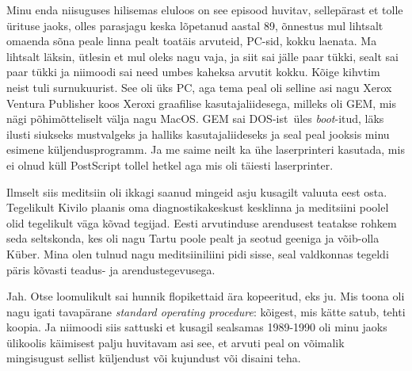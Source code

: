 Minu enda niisuguses hilisemas eluloos on see episood huvitav, sellepärast et tolle ürituse jaoks, olles parasjagu keska lõpetanud aastal 89,  õnnestus mul lihtsalt omaenda sõna peale linna pealt toatäis arvuteid, PC-sid, kokku laenata. Ma lihtsalt läksin, ütlesin et mul oleks nagu vaja, ja siit sai jälle paar tükki, sealt sai paar tükki ja niimoodi sai need umbes kaheksa arvutit kokku. Kõige kihvtim neist tuli surnukuurist. See oli üks PC, aga tema peal oli selline asi nagu Xerox Ventura Publisher koos Xeroxi graafilise kasutajaliidesega, milleks oli GEM, mis nägi põhimõtteliselt välja nagu MacOS. GEM sai DOS-ist üles \emph{boot}-itud,  läks ilusti siukseks mustvalgeks ja halliks kasutajaliideseks ja seal peal jooksis minu esimene küljendusprogramm. Ja me saime neilt ka ühe laserprinteri kasutada, mis ei olnud küll PostScript tollel hetkel aga mis oli täiesti  laserprinter. 


Ilmselt siis meditsiin oli ikkagi saanud mingeid asju kusagilt valuuta eest osta. Tegelikult Kivilo plaanis oma  diagnostikakeskust kesklinna ja meditsiini poolel olid  tegelikult  väga kõvad tegijad. Eesti arvutinduse arendusest teatakse rohkem seda seltskonda, kes oli nagu Tartu poole pealt ja seotud geeniga ja võib-olla Küber. Mina olen tulnud  nagu meditsiiniliini pidi sisse, seal valdkonnas tegeldi päris kõvasti teadus- ja arendustegevusega. 


Jah. Otse loomulikult sai hunnik flopikettaid ära kopeeritud, eks ju. Mis toona oli nagu igati tavapärane \emph{standard operating procedure}:  kõigest, mis kätte satub, tehti koopia. Ja niimoodi siis sattuski et kusagil sealsamas 1989-1990  oli minu jaoks ülikoolis käimisest palju huvitavam asi see, et arvuti peal on  võimalik mingisugust sellist küljendust või kujundust või disaini teha. 

